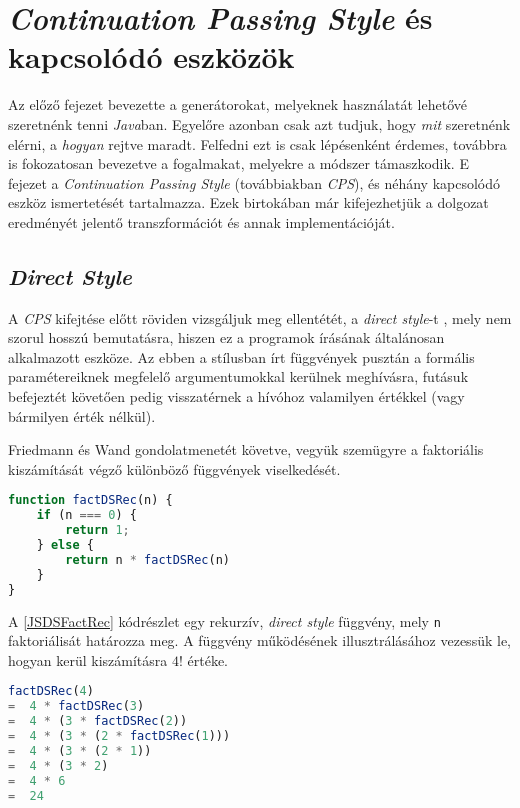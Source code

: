 \chapter{\textit{Continuation Passing Style} és kapcsolódó eszközök}

Az előző fejezet bevezette a generátorokat, melyeknek használatát lehetővé szeretnénk tenni \textit{Java}ban. Egyelőre azonban csak azt tudjuk, hogy \textit{mit} szeretnénk elérni, a \textit{hogyan} rejtve maradt. Felfedni ezt is csak lépésenként érdemes, továbbra is fokozatosan bevezetve a fogalmakat, melyekre a módszer támaszkodik. E fejezet a \textit{Continuation Passing Style} (továbbiakban \textit{CPS}), és néhány kapcsolódó eszköz ismertetését tartalmazza. Ezek birtokában már kifejezhetjük a dolgozat eredményét jelentő transzformációt és annak implementációját.

\section{\textit{Direct Style}}

A \textit{CPS} kifejtése előtt röviden vizsgáljuk meg ellentétét, a \textit{direct style}-t \cite{Danvy1994}, mely nem szorul hosszú bemutatásra, hiszen ez a programok írásának általánosan alkalmazott eszköze. Az ebben a stílusban írt függvények pusztán a formális paramétereiknek megfelelő argumentumokkal kerülnek meghívásra, futásuk befejeztét követően pedig visszatérnek a hívóhoz valamilyen értékkel (vagy bármilyen érték nélkül).

Friedmann és Wand \citeyear{EssProgLan} gondolatmenetét követve, vegyük szemügyre a faktoriális kiszámítását végző különböző függvények viselkedését.

\begin{lstlisting}[language=JavaScript, caption={\textit{Direct style} faktoriálist meghatározó rekurzív függvény JavaScriptben}, captionpos=b, label=JSDSFactRec]
function factDSRec(n) {
    if (n === 0) {
        return 1;
    } else {
        return n * factDSRec(n)
    }
}
\end{lstlisting}

A \ref{JSDSFactRec} kódrészlet egy rekurzív, \textit{direct style} függvény, mely \texttt{n} faktoriálisát határozza meg. A függvény működésének illusztrálásához vezessük le, hogyan kerül kiszámításra $4!$ értéke.

\begin{lstlisting}[language=JavaScript, caption={$4!$ kiszámítása \texttt{factDSRec} segítségével}, captionpos=b, numbers=none]
   factDSRec(4)
=  4 * factDSRec(3)
=  4 * (3 * factDSRec(2))
=  4 * (3 * (2 * factDSRec(1)))
=  4 * (3 * (2 * 1))
=  4 * (3 * 2)
=  4 * 6
=  24
\end{lstlisting}

